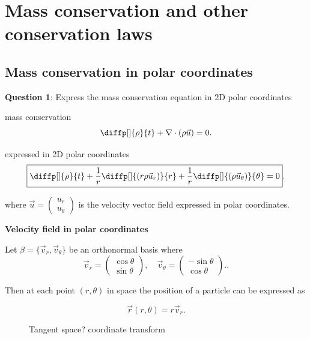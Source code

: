 
\subsectionfont{\fontsize{12}{12}\selectfont}


\section{Mass conservation and other conservation laws}%

\subsection{Mass conservation in polar coordinates}%

\textbf{Question 1}: Express the mass conservation equation in 2D polar
coordinates

mass conservation
\[
  \diffp[]{ \rho}{t} + \nabla \cdot ( \rho \vec{u}) = 0
.\] 

expressed in 2D polar coordinates
\[
  \boxed{\diffp[]{ \rho}{t} + \frac{1}{r} \diffp[]{(r\rho \vec{u}_r)}{r} + \frac{1}{r}
  \diffp[]{( \rho \vec{u}_\theta)}{\theta}= 0}
.\] 

where $\vec{u} = \begin{pmatrix} u_{r} \\ u_{\theta} \end{pmatrix}$ is the
velocity vector field expressed in polar coordinates.


\textbf{Velocity field in polar coordinates} 

Let $ \beta = \{ \vec{v}_r, \vec{v}_\theta\}$ be an orthonormal basis where
\[
\vec{v}_r = \begin{pmatrix} \cos{\theta} \\ \sin{\theta} \end{pmatrix}, \quad
\vec{v}_\theta = \begin{pmatrix} -\sin{\theta} \\ \cos{\theta} \end{pmatrix}.
.\] 

Then at each point $(r,\theta)$ in space
the position of a particle can be expressed as

\[
  \vec{r}(r,\theta) = r\vec{v}_r 
.\] 

\begin{figure}[H]
    \centering
    \caption{Tangent space? coordinate transform}
    \label{fig:polar}
\end{figure}

